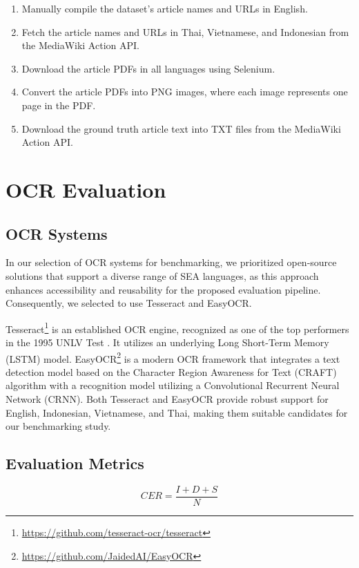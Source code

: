 \documentclass[12pt,oneside]{memoir}
\begin{document}
\begin{enumerate}
    \item Manually compile the dataset’s article names and URLs in English.
    \item Fetch the article names and URLs in Thai, Vietnamese, and Indonesian from the MediaWiki Action API.
    \item Download the article PDFs in all languages using Selenium.
    \item Convert the article PDFs into PNG images, where each image represents one page in the PDF.
    \item Download the ground truth article text into TXT files from the MediaWiki Action API.
\end{enumerate}

\section{OCR Evaluation}

\subsection{OCR Systems}
In our selection of OCR systems for benchmarking, we prioritized open-source 
solutions that support a diverse range of SEA languages, as this approach 
enhances accessibility and reusability for the proposed evaluation pipeline. 
Consequently, we selected to use Tesseract and EasyOCR. 

Tesseract\footnote{\url{https://github.com/tesseract-ocr/tesseract}} is an established OCR engine, recognized as one of the top performers 
in the 1995 UNLV Test \parencite{rice-etal-1995}. It utilizes an underlying Long Short-Term Memory (LSTM) 
model. EasyOCR\footnote{\url{https://github.com/JaidedAI/EasyOCR}} is a modern OCR framework that integrates a text detection model 
based on the Character Region Awareness for Text (CRAFT) algorithm with a 
recognition model utilizing a Convolutional Recurrent Neural Network (CRNN). Both 
Tesseract and EasyOCR provide robust support for English, Indonesian, Vietnamese, 
and Thai, making them suitable candidates for our benchmarking study.

\subsection{Evaluation Metrics}

\begin{equation}
    CER = \frac{I + D + S}{N}
    \label{equation:cer}
\end{equation}
\end{document}
